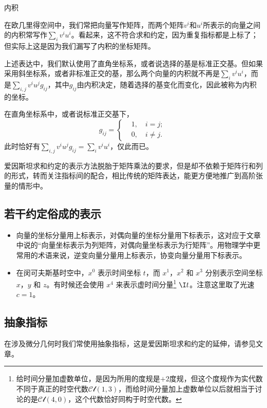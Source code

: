 \begin{example}{内积}

在欧几里得空间中，我们常把向量写作矩阵，而两个矩阵$v^i$和$u^i$所表示的向量之间的内积常写作$\sum_i v^iu^i$。看起来，这不符合求和约定，因为重复指标都是上标了；但实际上这是因为我们漏写了内积的坐标矩阵。

上述表达中，我们默认使用了直角坐标系，或者说选择的基是标准正交基。但如果采用斜坐标系，或者非标准正交的基，那么两个向量的内积就不再是$\sum_i v^iu^i$，而是$\sum_{i, j} v^iu^j g_{ij}$，其中$g_{ij}$由内积决定，随着选择的基变化而变化，因此被称为内积的坐标。

在直角坐标系中，或者说标准正交基下，
\begin{equation}
g_{ij}=
\left\{
    \begin{aligned}
    &1, \quad i=j;\\
    &0, \quad i\not= j. 
    \end{aligned}
\right. ~
\end{equation}
此时恰好有$\sum_{i, j} v^iu^j g_{ij}=\sum_i v^iu^i$，仅此而已。

\end{example}



爱因斯坦求和约定的表示方法脱胎于矩阵乘法的要求，但是却不依赖于矩阵行和列的形式，转而关注指标间的配合，相比传统的矩阵表达，能更方便地推广到高阶张量的情形中。


\subsection{若干约定俗成的表示}
\begin{itemize}
\item 向量的坐标分量用上标表示，对偶向量的坐标分量用下标表示，这对应于文章中说的“向量坐标表示为列矩阵，对偶向量坐标表示为行矩阵”。用物理学中更常用的术语来说，逆变向量分量用上标表示，协变向量分量用下标表示。

\item 在闵可夫斯基时空中，$x^0$ 表示时间坐标 $t$，而 $x^1$，$x^2$ 和 $x^3$ 分别表示空间坐标 $x$，$y$ 和 $z$。有时候还会使用 $x^4$ 来表示虚时间分量\footnote{给时间分量加虚数单位，是因为所用的度规是$+2$度规，但这个度规作为实代数不同于真正的时空代数$\mathcal{Cl}(1, 3)$，而给时间分量加上虚数单位以后就相当于讨论的是$\mathcal{Cl}(4, 0)$，这个代数恰好同构于时空代数。} $\I t$。注意这里取了光速 $c=1$。




\end{itemize}







\subsection{抽象指标}

在涉及微分几何时我们常使用抽象指标，这是爱因斯坦求和约定的延伸，请参见文章。




